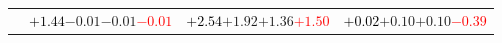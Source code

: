 \documentclass[compress]{beamer}
\begin{document}
\begin{frame}
\begin{tabular}{r | c | c | c}
          & \textcolor{black}{$+1.44$}\hspace{0.1 cm}$-0.01$\hspace{0.1 cm}$-0.01$\hspace{0.1 cm}\textcolor{red}{$-0.01$} & \textcolor{black}{$+2.54$}\hspace{0.1 cm}$+1.92$\hspace{0.1 cm}$+1.36$\hspace{0.1 cm}\textcolor{red}{$+1.50$} & \textcolor{black}{$+0.02$}\hspace{0.1 cm}$+0.10$\hspace{0.1 cm}$+0.10$\hspace{0.1 cm}\textcolor{red}{$-0.39$} \\
\end{tabular}
\end{frame}
\end{document}
